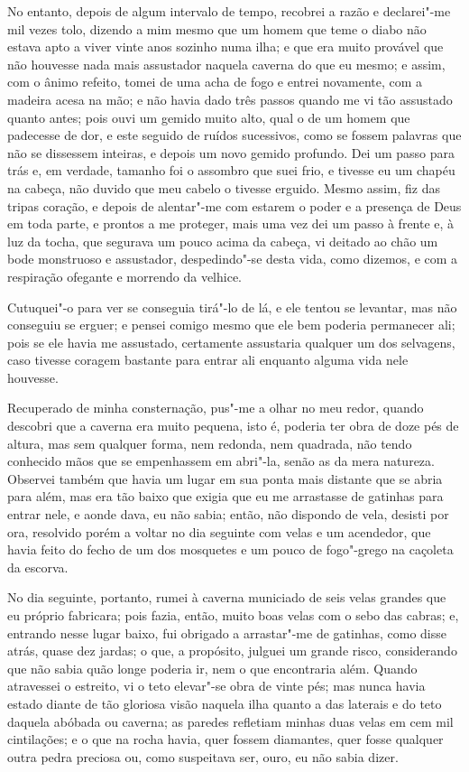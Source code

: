 No entanto, depois de algum intervalo de tempo, recobrei a razão e
declarei"-me mil vezes tolo, dizendo a mim mesmo que um homem que teme o
diabo não estava apto a viver vinte anos sozinho numa ilha; e que era
muito provável que não houvesse nada mais assustador naquela caverna do
que eu mesmo; e assim, com o ânimo refeito, tomei de uma acha de fogo e
entrei novamente, com a madeira acesa na mão; e não havia dado três
passos quando me vi tão assustado quanto antes; pois ouvi um gemido
muito alto, qual o de um homem que padecesse de dor, e este seguido de
ruídos sucessivos, como se fossem palavras que não se dissessem
inteiras, e depois um novo gemido profundo. Dei um passo para trás e, em
verdade, tamanho foi o assombro que suei frio, e tivesse eu um chapéu na
cabeça, não duvido que meu cabelo o tivesse erguido. Mesmo assim, fiz
das tripas coração, e depois de alentar"-me com estarem o poder e a
presença de Deus em toda parte, e prontos a me proteger, mais uma vez
dei um passo à frente e, à luz da tocha, que segurava um pouco acima da
cabeça, vi deitado ao chão um bode monstruoso e assustador,
despedindo"-se desta vida, como dizemos, e com a respiração ofegante e
morrendo da velhice.

Cutuquei"-o para ver se conseguia tirá"-lo de lá, e ele tentou se
levantar, mas não conseguiu se erguer; e pensei comigo mesmo que ele bem
poderia permanecer ali; pois se ele havia me assustado, certamente
assustaria qualquer um dos selvagens, caso tivesse coragem bastante para
entrar ali enquanto alguma vida nele houvesse.

Recuperado de minha consternação, pus"-me a olhar no meu redor, quando
descobri que a caverna era muito pequena, isto é, poderia ter obra de
doze pés de altura, mas sem qualquer forma, nem redonda, nem quadrada,
não tendo conhecido mãos que se empenhassem em abri"-la, senão as da mera
natureza. Observei também que havia um lugar em sua ponta mais distante
que se abria para além, mas era tão baixo que exigia que eu me
arrastasse de gatinhas para entrar nele, e aonde dava, eu não sabia;
então, não dispondo de vela, desisti por ora, resolvido porém a voltar
no dia seguinte com velas e um acendedor, que havia feito do fecho de um
dos mosquetes e um pouco de fogo"-grego na caçoleta da escorva.

No dia seguinte, portanto, rumei à caverna municiado de seis velas
grandes que eu próprio fabricara; pois fazia, então, muito boas velas
com o sebo das cabras; e, entrando nesse lugar baixo, fui obrigado a
arrastar"-me de gatinhas, como disse atrás, quase dez jardas; o que, a
propósito, julguei um grande risco, considerando que não sabia quão
longe poderia ir, nem o que encontraria além. Quando atravessei o
estreito, vi o teto elevar"-se obra de vinte pés; mas nunca havia estado
diante de tão gloriosa visão naquela ilha quanto a das laterais e do
teto daquela abóbada ou caverna; as paredes refletiam minhas duas velas
em cem mil cintilações; e o que na rocha havia, quer fossem diamantes,
quer fosse qualquer outra pedra preciosa ou, como suspeitava ser, ouro,
eu não sabia dizer.

